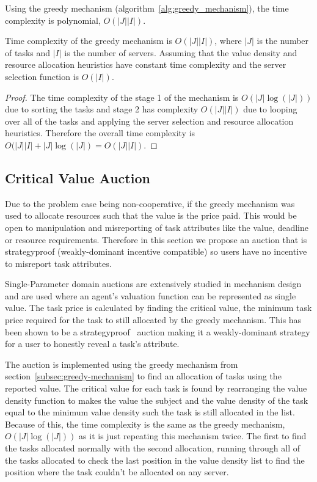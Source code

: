 Using the greedy mechanism (algorithm~\ref{alg:greedy_mechanism}), the time complexity is polynomial,
$O(\left|J\right| \left|I\right|)$.
\begin{theorem}
    Time complexity of the greedy mechanism is $O(\left|J\right| \left|I\right|)$, where $\left|J\right|$ is the number
    of tasks and $\left|I\right|$ is the number of servers. Assuming that the value density and resource allocation
    heuristics have constant time complexity and the server selection function is $O(\left|I\right|)$.
\end{theorem}
\begin{proof}
    The time complexity of the stage 1 of the mechanism is $O(\left|J\right| \log(\left|J\right|))$ due to sorting the
    tasks and stage 2 has complexity $O(\left|J\right| \left|I\right|)$ due to looping over all of the tasks and
    applying the server selection and resource allocation heuristics. Therefore the overall time complexity is
    $O(\left|J\right| \left|I\right| + \left|J\right| \log(\left|J\right|) = O(\left|J\right| \left|I\right|)$.
\end{proof}

\subsection{Critical Value Auction}\label{subsec:critical-value-auction}
Due to the problem case being non-cooperative, if the greedy mechanism was used to allocate resources such that the
value is the price paid. This would be open to manipulation and misreporting of task attributes like the value,
deadline or resource requirements. Therefore in this section we propose an auction that is strategyproof
(weakly-dominant incentive compatible) so users have no incentive to misreport task attributes.

Single-Parameter domain auctions are extensively studied in mechanism design~\cite{nisan2007algorithmic_228} and are
used where an agent's valuation function can be represented as single value. The task price is calculated by finding
the critical value, the minimum task price required for the task to still allocated by the greedy mechanism. This has
been shown to be a strategyproof~\cite{nisan2007algorithmic_229_230} auction making it a weakly-dominant strategy for
a user to honestly reveal a task's attribute.

The auction is implemented using the greedy mechanism from section~\ref{subsec:greedy-mechanism} to find an allocation
of tasks using the reported value. The critical value for each task is found by rearranging the value density function
to makes the value the subject and the value density of the task equal to the minimum value density such the task is
still allocated in the list. Because of this, the time complexity is the same as the greedy mechanism,
$O(\left|J\right| \log(\left|J\right|))$ as it is just repeating this mechanism twice. The first to find the tasks
allocated normally with the second allocation, running through all of the tasks allocated to check the last position
in the value density list to find the position where the task couldn't be allocated on any server.

